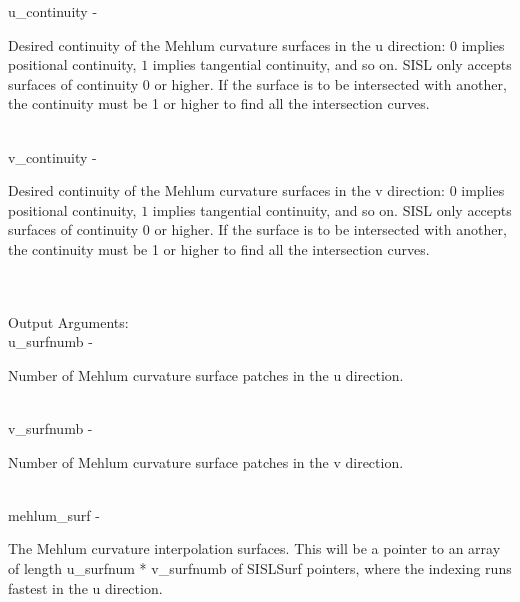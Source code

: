         \>\>    {\fov u\_continuity}\> - \>  \begin{minipg2}
                     Desired continuity of the Mehlum curvature surfaces
                          in the u direction: $0$ implies positional continuity,
                          $1$ implies tangential continuity, and so on.
                          SISL only accepts surfaces of continuity 0 or higher.
                          If the surface is to be intersected with another,
                          the continuity must be 1 or higher to find all the
                          intersection curves.
                               \end{minipg2}\\[0.8ex]
        \>\>    {\fov v\_continuity}\> - \>  \begin{minipg2}
                     Desired continuity of the Mehlum curvature surfaces
                          in the v direction: $0$ implies positional continuity,
                          $1$ implies tangential continuity, and so on.
                          SISL only accepts surfaces of continuity 0 or higher.
                          If the surface is to be intersected with another,
                          the continuity must be 1 or higher to find all the
                          intersection curves.
                               \end{minipg2}\\[0.8ex]
\\
	\>Output Arguments:\\
        \>\>    {\fov u\_surfnumb}\> - \>  \begin{minipg2}
                     Number of Mehlum curvature surface patches
                          in the u direction.
                               \end{minipg2}\\[0.8ex]
        \>\>    {\fov v\_surfnumb}\> - \>  \begin{minipg2}
                     Number of Mehlum curvature surface patches
                          in the v direction.
                               \end{minipg2}\\[0.8ex]
        \>\>    {\fov mehlum\_surf}\> - \>  \begin{minipg2}
                     The Mehlum curvature interpolation surfaces.
                          This will be a pointer to an array of length
                          {\fov u\_surfnum} * {\fov v\_surfnumb} of
                          SISLSurf pointers, where the indexing runs
                          fastest in the u direction.
                               \end{minipg2}\\[0.8ex]

